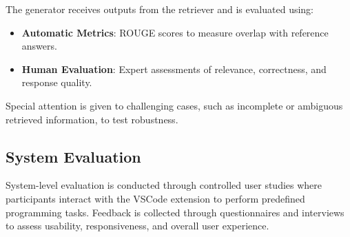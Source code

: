 The generator receives outputs from the retriever and is evaluated using:
\begin{itemize}
    \item \textbf{Automatic Metrics}: ROUGE scores to measure overlap with reference answers.
    \item \textbf{Human Evaluation}: Expert assessments of relevance, correctness, and response quality.
\end{itemize}
Special attention is given to challenging cases, such as incomplete or ambiguous retrieved information, to test robustness.

\subsection{System Evaluation}

System-level evaluation is conducted through controlled user studies where participants interact with the VSCode extension to perform predefined programming tasks. Feedback is collected through questionnaires and interviews to assess usability, responsiveness, and overall user experience.

\newpage